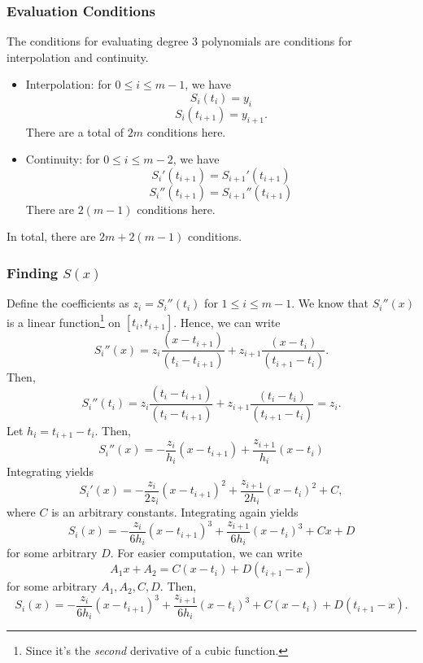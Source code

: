 \documentclass[letterpaper]{article}
\begin{document}
\subsubsection{Evaluation Conditions}
The conditions for evaluating degree 3 polynomials are conditions for interpolation and continuity.
\begin{itemize}
    \item Interpolation: for $0 \leq i \leq m - 1$, we have  
    \[S_{i}(t_i) = y_i\]
    \[S_{i}(t_{i + 1}) = y_{i + 1}.\]
    There are a total of $2m$ conditions here. 

    \item Continuity: for $0 \leq i \leq m - 2$, we have 
    \[S_{i}'(t_{i + 1}) = S_{i + 1}'(t_{i + 1})\]
    \[S_{i}''(t_{i + 1}) = S_{i + 1}''(t_{i + 1})\]
    There are $2(m - 1)$ conditions here.
\end{itemize}
In total, there are $2m + 2(m - 1)$ conditions. 

\subsubsection{Finding \texorpdfstring{$S(x)$}{S(x)}}

Define the coefficients as $z_i = S_{i}''(t_i)$ for $1 \leq i \leq m - 1$. We know that $S_{i}''(x)$ is a linear function\footnote{Since it's the \emph{second} derivative of a cubic function.} on $[t_i, t_{i + 1}]$. Hence, we can write 
\[S_{i}''(x) = z_i \frac{(x - t_{i + 1})}{(t_i - t_{i + 1})} + z_{i + 1}\frac{(x - t_i)}{(t_{i + 1} - t_i)}.\]
Then, 
\[S_{i}''(t_i) = z_i \frac{(t_i - t_{i + 1})}{(t_i - t_{i + 1})} + z_{i + 1}\frac{(t_i - t_i)}{(t_{i + 1} - t_i)} = z_i.\]
Let $h_i = t_{i + 1} - t_i$. Then,
\[S_{i}''(x) = -\frac{z_i}{h_i}(x - t_{i + 1}) + \frac{z_{i + 1}}{h_i}(x - t_i)\]
Integrating yields
\[S_{i}'(x) = -\frac{z_i}{2z_i}(x - t_{i + 1})^2 + \frac{z_{i + 1}}{2h_i}(x - t_i)^2 + C,\]
where $C$ is an arbitrary constants. Integrating again yields  
\[S_i (x) = -\frac{z_i}{6h_i}(x - t_{i + 1})^3 + \frac{z_{i + 1}}{6h_i} (x - t_i)^3 + Cx + D\]
for some arbitrary $D$. For easier computation, we can write 
\[A_1 x + A_2 = C(x - t_i) + D(t_{i + 1} - x)\]
for some arbitrary $A_1, A_2, C, D$. Then, 
\[S_{i}(x) = -\frac{z_i}{6h_i}(x - t_{i + 1})^3 + \frac{z_{i + 1}}{6h_i} (x - t_i)^3 + C(x - t_i) + D(t_{i + 1} - x).\]
\end{document}

